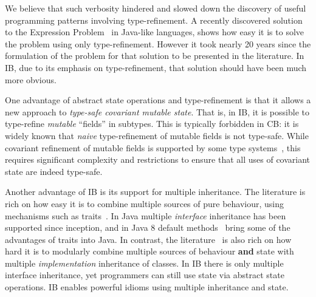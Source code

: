 We believe that such verbosity hindered and slowed
down the discovery of useful programming patterns involving
type-refinement. A recently discovered
solution~\cite{eptrivially} to the Expression
Problem~\cite{wadler98expression} in Java-like languages, shows how easy it is to solve
the problem using only type-refinement. However it took nearly 20
years since the formulation of the problem for that
solution to be presented in the literature. In IB, due to
its emphasis on type-refinement, that solution should have been much
more obvious.

One advantage of abstract state operations and
type-refinement is that it allows a new approach to
\emph{type-safe covariant mutable state}. That is, in IB,
it is possible to type-refine \emph{mutable} ``fields'' in subtypes. This is
typically forbidden in CB: it is widely known that \emph{naive} type-refinement of
mutable fields is not type-safe. While covariant refinement of mutable
fields is supported by some type systems~\cite{bruce98astatically,bruce1994paradigmatic,ernst06virtual,Saito2013933}, this requires
significant complexity and restrictions to ensure that all uses of
covariant state are indeed type-safe.

\begin{comment}
\marcoT{%

In this paper we show how to support type-safe
\textbf{field removal},
\textbf{field type refinement} allowing a kind of covariant setters refinement,
and \textbf{multiple inheritance}.}
\end{comment}

Another advantage of IB is its support for
multiple inheritance. The literature is rich on how
easy it is to combine multiple sources of pure behaviour,
using mechanisms such as traits~\cite{scharli03traits}. In Java
multiple \emph{interface} inheritance has been supported since
inception, and in Java 8 default methods~\cite{goetz12fdefenders} bring some of the
advantages of traits into Java. In contrast, the literature~\cite{Sak89dis,bracha90mixin,malayeri2009cz}
is also rich on how hard it is to modularly combine multiple sources
of behaviour \textbf{and} state with multiple \emph{implementation}
inheritance of classes. In IB there is only multiple
interface inheritance, yet programmers can still use state via 
abstract state operations. IB enables powerful
idioms using multiple inheritance and state.


